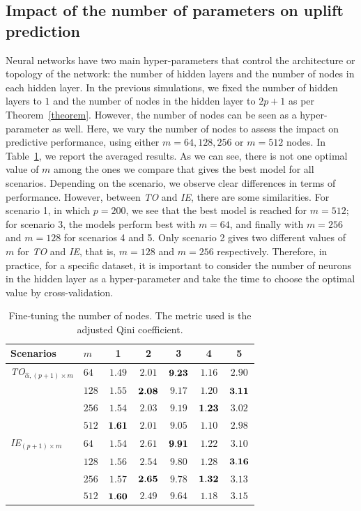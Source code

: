 \documentclass{article}
\begin{document}
\subsection{Impact of the number of parameters on uplift prediction}

Neural networks have two main hyper-parameters that control the architecture or topology of the network: the number of hidden layers and the number of nodes in each hidden layer. In the previous simulations, we fixed the number of hidden layers to $1$ and the number of nodes in the hidden layer to $2p+1$ as per Theorem~\ref{theorem}. However, the number of nodes can be seen as a hyper-parameter as well. Here, we vary the number of nodes to assess the impact on predictive performance, using either $m=64, 128, 256$ or $m=512$ nodes.  In Table~\ref{tab:hidden_neurons_results}, we report the averaged results. As we can see, there is not one optimal value of $m$ among the ones we compare that gives the best model for all scenarios. Depending on the scenario, we observe clear differences in terms of performance. However, between {\it TO} and {\it IE}, there are some similarities. For scenario 1, in which $p = 200$, we see that the best model is reached for $m = 512$; for scenario 3, the models perform best with $m = 64$, and finally with $m = 256$ and $m = 128$ for scenarios 4 and 5. Only scenario 2 gives two different values of $m$ for {\it TO} and {\it IE}, that is, $m = 128$ and $m = 256$ respectively. Therefore, in practice, for a specific dataset, it is important to consider the number of neurons in the hidden layer as a hyper-parameter and take the time to choose the optimal value by cross-validation.

\begin{table}[!ht]
    \centering
    \caption{Fine-tuning the number of nodes. The metric used is the adjusted Qini coefficient.}
    \label{tab:hidden_neurons_results}
    \begin{tabular}{l|l|ccccc}
        Scenarios &$m$ & 1 & 2 & 3 & 4 & 5\\
        \hline
        {\it TO$_{\hat\alpha,(p+1)\times m}$} 
        & $64$ & $1.49$ & $2.01$ & $\bf 9.23$ & $1.16$ & $2.90$\\
        & $128$ & $1.55$ & $\bf 2.08$ & $9.17$ & $1.20$ & $\bf 3.11$\\
        & $256$ & $1.54$ & $2.03$ & $9.19$ & $\bf 1.23$ & $3.02$ \\
        & $512$ & $\bf 1.61$ & $2.01$ & $9.05$ & $1.10$ & $2.98$\\
        \hline
        {\it IE$_{(p+1)\times m}$} 
        & $64$ & $1.54$  & $2.61$ & $\bf 9.91$ & $1.22$ & $3.10$ \\
        & $128$ & $1.56$  & $2.54$ & $9.80$ & $1.28$ & $\bf 3.16$\\
        & $256$ & $1.57$ & $\bf 2.65$ & $9.78$ & $\bf 1.32$ & $3.13$ \\
        & $512$ & $\bf 1.60$ & $2.49$ & $9.64$ & $1.18$ & $3.15$\\
               \hline
    \end{tabular}
\end{table}
\end{document}
